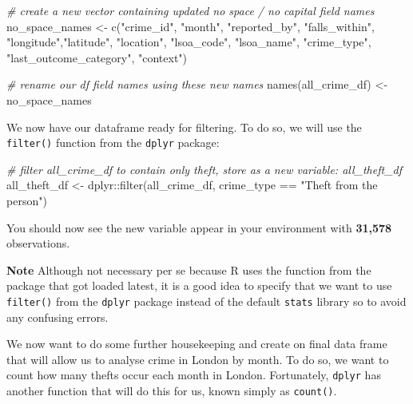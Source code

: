 \documentclass[
]{book}
\newenvironment{Shaded}{\begin{snugshade}}{\end{snugshade}}
\newcommand{\CommentTok}[1]{\textcolor[rgb]{0.56,0.35,0.01}{\textit{#1}}}
\newcommand{\FunctionTok}[1]{\textcolor[rgb]{0.00,0.00,0.00}{#1}}
\newcommand{\NormalTok}[1]{#1}
\newcommand{\OtherTok}[1]{\textcolor[rgb]{0.56,0.35,0.01}{#1}}
\newcommand{\SpecialCharTok}[1]{\textcolor[rgb]{0.00,0.00,0.00}{#1}}
\newcommand{\StringTok}[1]{\textcolor[rgb]{0.31,0.60,0.02}{#1}}
\begin{document}
\begin{Shaded}
\begin{Highlighting}[]
\CommentTok{\# create a new vector containing updated no space / no capital field names}
\NormalTok{no\_space\_names }\OtherTok{\textless{}{-}} \FunctionTok{c}\NormalTok{(}\StringTok{"crime\_id"}\NormalTok{, }\StringTok{"month"}\NormalTok{, }\StringTok{"reported\_by"}\NormalTok{, }\StringTok{"falls\_within"}\NormalTok{, }\StringTok{"longitude"}\NormalTok{,}\StringTok{"latitude"}\NormalTok{, }\StringTok{"location"}\NormalTok{, }\StringTok{"lsoa\_code"}\NormalTok{, }\StringTok{"lsoa\_name"}\NormalTok{, }\StringTok{"crime\_type"}\NormalTok{, }\StringTok{"last\_outcome\_category"}\NormalTok{, }\StringTok{"context"}\NormalTok{)}

\CommentTok{\# rename our df field names using these new names}
\FunctionTok{names}\NormalTok{(all\_crime\_df) }\OtherTok{\textless{}{-}}\NormalTok{ no\_space\_names}
\end{Highlighting}
\end{Shaded}

We now have our dataframe ready for filtering. To do so, we will use the \texttt{filter()} function from the \texttt{dplyr} package:

\begin{Shaded}
\begin{Highlighting}[]
\CommentTok{\# filter all\_crime\_df to contain only theft, store as a new variable: all\_theft\_df}
\NormalTok{all\_theft\_df }\OtherTok{\textless{}{-}}\NormalTok{ dplyr}\SpecialCharTok{::}\FunctionTok{filter}\NormalTok{(all\_crime\_df, crime\_type }\SpecialCharTok{==} \StringTok{"Theft from the person"}\NormalTok{)}
\end{Highlighting}
\end{Shaded}

You should now see the new variable appear in your environment with \textbf{31,578} observations.

\textbf{Note}
Although not necessary per se because R uses the function from the package that got loaded latest, it is a good idea to specify that we want to use \texttt{filter()} from the \texttt{dplyr} package instead of the default \texttt{stats} library so to avoid any confusing errors.

We now want to do some further housekeeping and create on final data frame that will allow us to analyse crime in London by month. To do so, we want to count how many thefts occur each month in London. Fortunately, \texttt{dplyr} has another function that will do this for us, known simply as \texttt{count()}.
\end{document}
